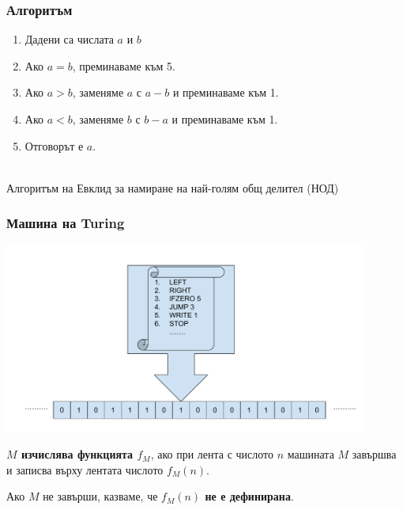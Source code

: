 \documentclass[alsotrans]{beamerswitch}
\begin{document}
\begin{frame}
  \frametitle{Алгоритъм}
  \begin{enumerate}
  \item Дадени са числата $a$ и $b$
  \item Ако $a = b$, преминаваме към 5.
  \item Ако $a > b$, заменяме $a$ с $a - b$ и преминаваме към 1.
  \item Ако $a < b$, заменяме $b$ с $b - a$ и преминаваме към 1.
  \item Отговорът е $a$.
  \end{enumerate}
  \pause\ \\[2em]
  Алгоритъм на Евклид за намиране на най-голям общ делител (НОД)
\end{frame}

\begin{frame}
  \frametitle{Машина на Turing}

  \includegraphics[width=0.9\textwidth]{images/turing.pdf}

  \pause
  \textbf{$M$ изчислява функцията $f_M$}, ако при лента с числото $n$ машината $M$ завършва и записва върху лентата числото $f_M(n)$.

  \pause
  Ако $M$ не завърши, казваме, че \textbf{$f_M(n)$ не е дефинирана}.
\end{frame}
\end{document}
